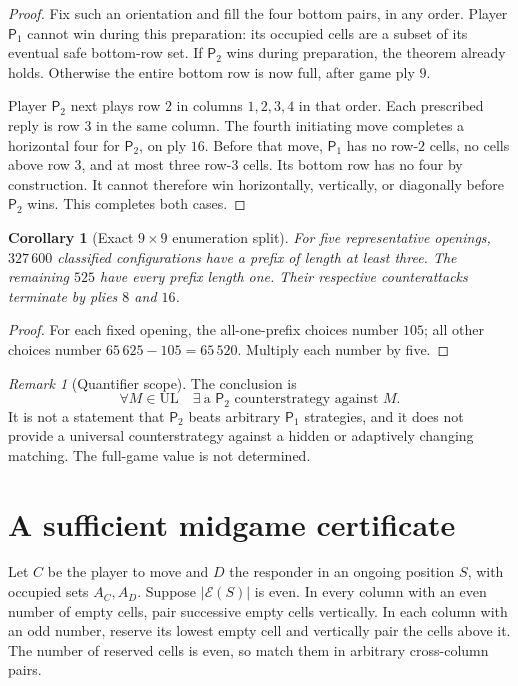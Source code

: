 \documentclass[11pt]{article}
\newtheorem{corollary}[theorem]{Corollary}
\theoremstyle{definition}
\theoremstyle{remark}
\newtheorem{remark}[theorem]{Remark}
\newcommand{\Pone}{\mathsf{P}_1}
\newcommand{\Ptwo}{\mathsf{P}_2}
\newcommand{\E}{\mathcal E}
\newcommand{\UL}{\mathrm{UL}}
\begin{document}
\begin{proof}
Fix such an orientation and fill the four bottom pairs, in any order.
Player $\Pone$ cannot win during this preparation: its occupied cells
are a subset of its eventual safe bottom-row set. If $\Ptwo$ wins during
preparation, the theorem already holds. Otherwise the entire bottom row
is now full, after game ply $9$.

Player $\Ptwo$ next plays row $2$ in columns $1,2,3,4$ in that order.
Each prescribed reply is row $3$ in the same column. The fourth initiating
move completes a horizontal four for $\Ptwo$, on ply $16$.
Before that move, $\Pone$ has no row-$2$ cells, no cells above row $3$,
and at most three row-$3$ cells. Its bottom row has no four by construction.
It cannot therefore win horizontally, vertically, or diagonally before
$\Ptwo$ wins. This completes both cases.
\end{proof}

\begin{corollary}[Exact $9\times9$ enumeration split]\label{cor:split}
For five representative openings, $327\,600$ classified configurations
have a prefix of length at least three. The remaining $525$ have every
prefix length one. Their respective counterattacks terminate by plies $8$
and $16$.
\end{corollary}
\begin{proof}
For each fixed opening, the all-one-prefix choices number $105$; all other
choices number $65\,625-105=65\,520$. Multiply each number by five.
\end{proof}

\begin{remark}[Quantifier scope]
The conclusion is
\[
 \forall M\in\UL\quad\exists\ \text{a $\Ptwo$ counterstrategy against }M.
\]
It is not a statement that $\Ptwo$ beats arbitrary $\Pone$ strategies,
and it does not provide a universal counterstrategy against a hidden or
adaptively changing matching. The full-game value is not determined.
\end{remark}

\section[Certified midgame bounds]{A sufficient midgame certificate}\label{sec:oracle}
Let $C$ be the player to move and $D$ the responder in an ongoing position
$S$, with occupied sets $A_C,A_D$. Suppose $|\E(S)|$ is even. In every
column with an even number of empty cells, pair successive empty cells
vertically. In each column with an odd number, reserve its lowest empty
cell and vertically pair the cells above it. The number of reserved cells
is even, so match them in arbitrary cross-column pairs.
\end{document}

